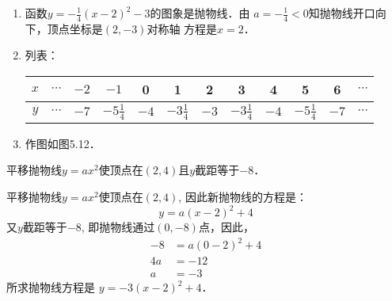 \begin{solution}
\begin{enumerate}
    \item 函数$y=-\frac{1}{4}(x-2)^2-3$的图象是抛物线．由
    $a=-\frac{1}{4}<0$知抛物线开口向下，顶点坐标是$(2,-3)$对称轴
    方程是$x=2$．
  \item 列表：
\begin{center}
\begin{tabular}{c|ccccccccccc}
\hline
$x$&$\cdots$& $-2$ &  $-1$ & 0 &  1 & 2 &  3 &  4 &  5 &  6 &$\cdots$\\
\hline
$y$&$\cdots$ & $-7$& $-5\tfrac{1}{4}$ &  $-4$ &  $-3\tfrac{1}{4}$ &  $-3$ &  $-3\tfrac{1}{4}$ &  $-4$ &  $-5\tfrac{1}{4}$ &  $-7$ &  $\cdots$ \\
\hline
\end{tabular}
\end{center}  

\item 作图如图5.12．
\end{enumerate}

\begin{figure}[htp]
    \centering
{}
    \caption{}
\end{figure}
\end{solution}


\begin{example}
    平移抛物线$y=ax^2$使顶点在$(2,4)$且$y$截距等于$-8$．
\end{example}

\begin{solution}
    平移抛物线$y=ax^2$使顶点在$(2,4)$, 因此新抛物线的方程是：
   \[ y=a(x-2)^2+4\]
    又$y$截距等于$-8$, 即抛物线通过$(0,-8)$点，因此，
\[\begin{split}
    -8&=a(0-2)^2+4\\
4a&=-12\\
a&=-3
\end{split}\]
所求抛物线方程是 $y=-3(x-2)^2+4$．
\end{solution}

